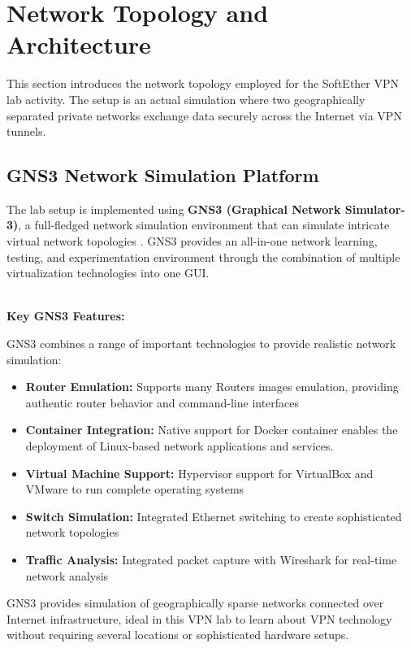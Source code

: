 \newpage

\section{Network Topology and Architecture}

This section introduces the network topology employed for the SoftEther VPN lab activity. The setup is an actual simulation where two geographically separated private networks exchange data securely across the Internet via VPN tunnels.

\subsection{GNS3 Network Simulation Platform}

The lab setup is implemented using \textbf{GNS3 (Graphical Network Simulator-3)}, a full-fledged network simulation environment that can simulate intricate virtual network topologies \cite{gns3_official}. GNS3 provides an all-in-one network learning, testing, and experimentation environment through the combination of multiple virtualization technologies into one GUI.

\noindent
\\
\textbf{Key GNS3 Features:}

GNS3 combines a range of important technologies to provide realistic network simulation:

\begin{itemize}
    \item \textbf{Router Emulation:} Supports many Routers images emulation, providing authentic router behavior and command-line interfaces
    \item \textbf{Container Integration:} Native support for Docker container enables the deployment of Linux-based network applications and services.
    \item \textbf{Virtual Machine Support:} Hypervisor support for VirtualBox and VMware to run complete operating systems
    \item \textbf{Switch Simulation:} Integrated Ethernet switching to create sophisticated network topologies
    \item \textbf{Traffic Analysis:} Integrated packet capture with Wireshark for real-time network analysis
\end{itemize}

GNS3 provides simulation of geographically sparse networks connected over Internet infrastructure, ideal in this VPN lab to learn about VPN technology without requiring several locations or sophisticated hardware setups\cite{gns3_docs}.

